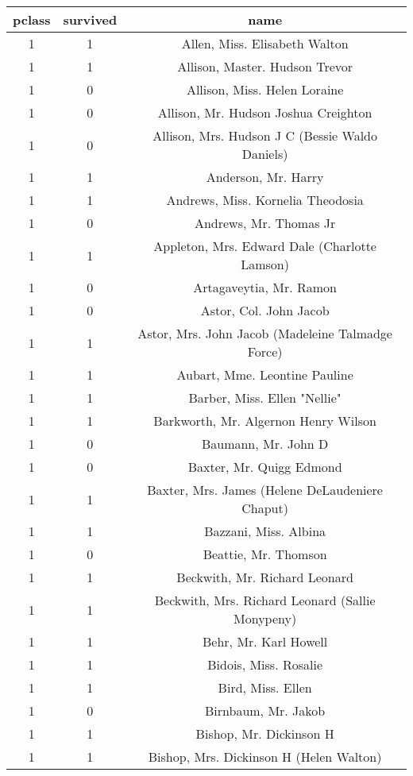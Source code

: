 \begin{tabular}{|c|c|c|}
	\hline
	pclass & survived & name \\
	\hline
	1 & 1 & Allen, Miss. Elisabeth Walton \\
	\hline
	1 & 1 & Allison, Master. Hudson Trevor \\
	\hline
	1 & 0 & Allison, Miss. Helen Loraine \\
	\hline
	1 & 0 & Allison, Mr. Hudson Joshua Creighton \\
	\hline
	1 & 0 & Allison, Mrs. Hudson J C (Bessie Waldo Daniels) \\
	\hline
	1 & 1 & Anderson, Mr. Harry \\
	\hline
	1 & 1 & Andrews, Miss. Kornelia Theodosia \\
	\hline
	1 & 0 & Andrews, Mr. Thomas Jr \\
	\hline
	1 & 1 & Appleton, Mrs. Edward Dale (Charlotte Lamson) \\
	\hline
	1 & 0 & Artagaveytia, Mr. Ramon \\
	\hline
	1 & 0 & Astor, Col. John Jacob \\
	\hline
	1 & 1 & Astor, Mrs. John Jacob (Madeleine Talmadge Force) \\
	\hline
	1 & 1 & Aubart, Mme. Leontine Pauline \\
	\hline
	1 & 1 & Barber, Miss. Ellen "Nellie" \\
	\hline
	1 & 1 & Barkworth, Mr. Algernon Henry Wilson \\
	\hline
	1 & 0 & Baumann, Mr. John D \\
	\hline
	1 & 0 & Baxter, Mr. Quigg Edmond \\
	\hline
	1 & 1 & Baxter, Mrs. James (Helene DeLaudeniere Chaput) \\
	\hline
	1 & 1 & Bazzani, Miss. Albina \\
	\hline
	1 & 0 & Beattie, Mr. Thomson \\
	\hline
	1 & 1 & Beckwith, Mr. Richard Leonard \\
	\hline
	1 & 1 & Beckwith, Mrs. Richard Leonard (Sallie Monypeny) \\
	\hline
	1 & 1 & Behr, Mr. Karl Howell \\
	\hline
	1 & 1 & Bidois, Miss. Rosalie \\
	\hline
	1 & 1 & Bird, Miss. Ellen \\
	\hline
	1 & 0 & Birnbaum, Mr. Jakob \\
	\hline
	1 & 1 & Bishop, Mr. Dickinson H \\
	\hline
	1 & 1 & Bishop, Mrs. Dickinson H (Helen Walton) \\

\end{tabular}
